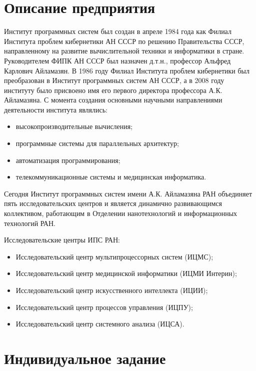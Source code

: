 \documentclass[12pt]{article}
\begin{document}
\tableofcontents

\section{Описание предприятия}

Институт программных систем был создан в апреле 1984 года как Филиал Института
проблем кибернетики АН СССР по решению Правительства СССР, направленному на
развитие вычислительной техники и информатики в стране. Руководителем ФИПК АН
СССР был назначен д.т.н., профессор Альфред Карлович Айламазян. В 1986 году
Филиал Института проблем кибернетики был преобразован в Институт программных
систем АН СССР, а в 2008 году институту было присвоено имя его первого
директора профессора А.К. Айламазяна. С момента создания основными научными
направлениями деятельности института являлись:
\begin{itemize}
\item высокопроизводительные вычисления;
\item программные системы для параллельных архитектур;
\item автоматизация программирования;
\item телекоммуникационные системы и медицинская информатика.
\end{itemize}
Сегодня Институт программных систем имени А.К. Айламазяна РАН объединяет пять
исследовательских центров и является динамично развивающимся коллективом,
работающим в Отделении нанотехнологий и информационных технологий РАН.

Исследовательские центры ИПС РАН:
\begin{itemize}
\item Исследовательский центр мультипроцессорных систем (ИЦМС);
\item Исследовательский центр медицинской информатики (ИЦМИ Интерин);
\item Исследовательский центр искусственного интеллекта (ИЦИИ); 
\item Исследовательский центр процессов управления (ИЦПУ);
\item Исследовательский центр системного анализа (ИЦСА).
\end{itemize}



\section{Индивидуальное задание}
\end{document}
